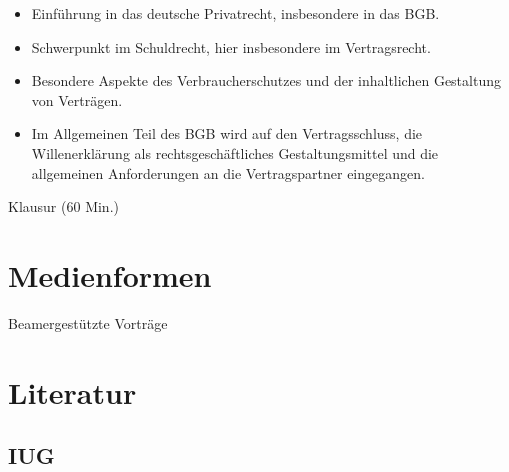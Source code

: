 \begin{itemize}
\tightlist
\item
  Einführung in das deutsche Privatrecht, insbesondere in das BGB.
\item
  Schwerpunkt im Schuldrecht, hier insbesondere im Vertragsrecht.
\item
  Besondere Aspekte des Verbraucherschutzes und der inhaltlichen
  Gestaltung von Verträgen.
\item
  Im Allgemeinen Teil des BGB wird auf den Vertragsschluss, die
  Willenerklärung als rechtsgeschäftliches Gestaltungsmittel und die
  allgemeinen Anforderungen an die Vertragspartner eingegangen.
\end{itemize}

Klausur (60 Min.)

\hypertarget{medienformenpathlabelmi-2017modulbeschreibungen-bachelorba_mug}{%
\section*{Medienformen\label{/mi-2017/modulbeschreibungen-bachelor/BA_MUG}}\label{medienformenpathlabelmi-2017modulbeschreibungen-bachelorba_mug}}

Beamergestützte Vorträge

\hypertarget{literaturpathlabelmi-2017modulbeschreibungen-bachelorba_mug}{%
\section*{Literatur\label{/mi-2017/modulbeschreibungen-bachelor/BA_MUG}}\label{literaturpathlabelmi-2017modulbeschreibungen-bachelorba_mug}}

\hypertarget{iugpathlabelmi-2017modulbeschreibungen-bachelorba_mug}{%
\subsection*{IUG\label{/mi-2017/modulbeschreibungen-bachelor/BA_MUG}}\label{iugpathlabelmi-2017modulbeschreibungen-bachelorba_mug}}

